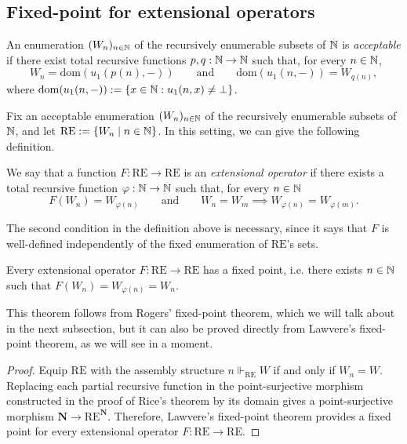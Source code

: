 \subsection*{Fixed-point for extensional operators}
\begin{definition}
    An enumeration $(W_n)_{n\in\mathbb{N}}$ of the recursively enumerable subsets of $\mathbb{N}$ is \emph{acceptable} if there exist total recursive functions $p,q:\mathbb{N}\to\mathbb{N}$ such that, for every $n\in\mathbb{N}$,
    \[ W_n=\mathrm{dom}(u_1(p(n),-)) \qquad\text{and}\qquad \mathrm{dom}(u_1(n,-))=W_{q(n)}, \]
    where $\mathrm{dom}(u_1(n,-)) := \{x \in \mathbb{N} : u_1(n,x) \ne \bot\}$.
\end{definition}

Fix an acceptable enumeration $(W_n)_{n\in\mathbb{N}}$ of the recursively enumerable subsets of $\mathbb{N}$, and let $\mathrm{RE}:=\{W_n\mid n\in\mathbb{N}\}$.\label{idx:re-sets}
In this setting, we can give the following definition.

\begin{definition}
    We say that a function $F : \mathrm{RE} \to \mathrm{RE}$ is an \emph{extensional operator} if there exists a total recursive function $\varphi : \mathbb{N} \to \mathbb{N}$ such that, for every $n \in \mathbb{N}$
    \[ F(W_n) = W_{\varphi(n)} \qquad \text{and} \qquad W_n = W_m \implies W_{\varphi(n)} = W_{\varphi(m)}. \]
\end{definition}

\begin{remark}
    The second condition in the definition above is necessary, since it says that $F$ is well-defined independently of the fixed enumeration of $\mathrm{RE}$'s sets.
\end{remark}

\begin{theorem}
    Every extensional operator $F : \mathrm{RE} \to \mathrm{RE}$ has a fixed point, i.e. there exists $n \in \mathbb{N}$ such that $F(W_n) = W_{\varphi(n)} = W_n$.
\end{theorem}

\begin{remark}
    This theorem follows from Rogers' fixed-point theorem, which we will talk about in the next subsection, but it can also be proved directly from Lawvere's fixed-point theorem, as we will see in a moment.
\end{remark}

\begin{proof}
    Equip $\mathrm{RE}$ with the assembly structure $n \Vdash_{\mathrm{RE}} W$ if and only if $W_n=W$.
    Replacing each partial recursive function in the point-surjective morphism constructed in the proof of Rice's theorem by its domain gives a point-surjective morphism $\mathbf N\to\mathrm{RE}^{\mathbf N}$.
    Therefore, Lawvere's fixed-point theorem provides a fixed point for every extensional operator $F : \mathrm{RE} \to \mathrm{RE}$.
\end{proof}

